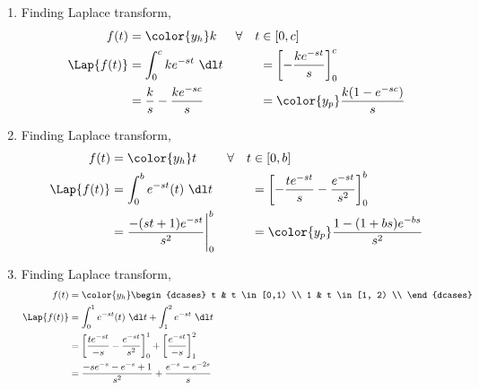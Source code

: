 \begin{enumerate}
    \item Finding Laplace transform,
          \begin{align}
              f(t)             & = \color{y_h} k                          &
              \forall \quad  t & \in [0,c]                                  \\
              \Lap\{f(t)\}     & =  \int_{0}^{c} ke^{-st}\ \dl t          &
                               & = \left[ -\frac{ke^{-st}}{s} \right]_0^c   \\
                               & = \frac{k}{s} - \frac{ke^{-sc}}{s}       &
                               & = \color{y_p}\frac{k(1 - e^{-sc})}{s}
          \end{align}
    \item Finding Laplace transform,
          \begin{align}
              f(t)             & = \color{y_h} t                            &
              \forall \quad  t & \in [0,b]                                    \\
              \Lap\{f(t)\}     & =  \int_{0}^{b} e^{-st}(t)\ \dl t          &
                               & = \left[ -\frac{te^{-st}}{s} -
              \frac{e^{-st}}{s^2} \right]_0^b                                 \\
                               & = \frac{-(st+1)e^{-st}}{s^2}\Bigg|_0^b     &
                               & = \color{y_p}\frac{1 - (1+bs)e^{-bs}}{s^2}
          \end{align}
    \item Finding Laplace transform,
          \begin{align}
              f(t)         & = \color{y_h}
              \begin{dcases}
                  t & t \in [0,1)  \\
                  1 & t \in [1, 2) \\
              \end{dcases}                                             \\
              \Lap\{f(t)\} & =  \int_{0}^{1} e^{-st}(t)\ \dl t
              +  \int_{1}^{2} e^{-st}\ \dl t                               \\
                           & = \left[ \frac{te^{-st}}{-s}
                  - \frac{e^{-st}}{s^2}  \right]_0^1
              + \left[ \frac{e^{-st}}{-s} \right]_1^2                      \\
                           & = \frac{-se^{-s} - e^{-s} + 1}{s^2}
              + \frac{e^{-s} - e^{-2s}}{s}                                 \\

\end{align}
\end{enumerate}

